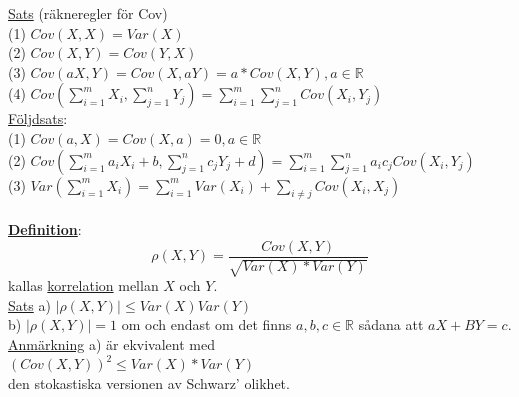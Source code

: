\documentclass[8pt]{extarticle}
\begin{document}
\begin{multicols*}{2}
\underline{Sats} (räkneregler för Cov)\\
(1) $Cov(X,X) = Var(X)$\\
(2) $Cov(X,Y) = Cov(Y,X)$\\
(3) $Cov(aX,Y) = Cov(X,aY) = a * Cov(X,Y), a \in \mathbb{R}$\\
(4) $Cov(\sum_{i = 1}^mX_i, \sum_{j = 1}^nY_j) = \sum_{i = 1}^m \sum_{j = 1}^n Cov(X_i, Y_j)$\\
\underline{Följdsats}:\\
(1) $Cov(a, X) = Cov(X, a) = 0, a \in \mathbb{R}$\\
(2) $Cov(\sum_{i = 1}^ma_iX_i+b, \sum_{j = 1}^nc_jY_j+d) = \sum_{i = 1}^m \sum_{j = 1}^n a_ic_j Cov(X_i, Y_j)$\\
(3) $Var(\sum_{i = 1}^m X_i) = \sum_{i = 1}^m Var(X_i) + \sum_{i \neq j} Cov(X_i, X_j)$\\
\\
\underline{\textbf{Definition}}:\\
\begin{equation*}
\rho (X,Y) = \frac{Cov(X,Y)}{\sqrt{Var(X) * Var(Y)}}
\end{equation*}
kallas \underline{korrelation} mellan $X$ och $Y$.\\
\underline{Sats} a) $|\rho(X,Y)| \leq Var(X)Var(Y)$\\
b) $|\rho(X,Y)| = 1$ om och endast om det finns $a,b,c \in \mathbb{R}$ sådana att $aX + BY = c$.\\
\underline{Anmärkning} a) är ekvivalent med\\
$(Cov(X,Y))^2 \leq Var(X)*Var(Y)$\\
den stokastiska versionen av Schwarz' olikhet.\\


\end{multicols*}
\end{document}
